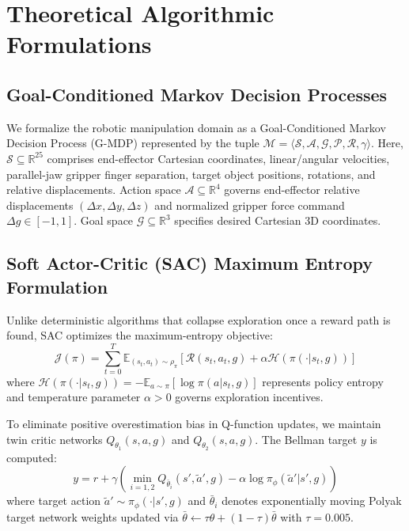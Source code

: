 \documentclass[10pt,twocolumn,a4paper]{article}
\newcommand{\R}{\mathbb{R}}
\newcommand{\E}{\mathbb{E}}
\begin{document}
\section{Theoretical Algorithmic Formulations}
\label{sec:theory}

\subsection{Goal-Conditioned Markov Decision Processes}
We formalize the robotic manipulation domain as a Goal-Conditioned Markov Decision Process (G-MDP) represented by the tuple $\mathcal{M} = \langle \mathcal{S}, \mathcal{A}, \mathcal{G}, \mathcal{P}, \mathcal{R}, \gamma \rangle$. Here, $\mathcal{S} \subseteq \R^{25}$ comprises end-effector Cartesian coordinates, linear/angular velocities, parallel-jaw gripper finger separation, target object positions, rotations, and relative displacements. Action space $\mathcal{A} \subseteq \R^4$ governs end-effector relative displacements $(\Delta x, \Delta y, \Delta z)$ and normalized gripper force command $\Delta g \in [-1, 1]$. Goal space $\mathcal{G} \subseteq \R^3$ specifies desired Cartesian 3D coordinates.

\subsection{Soft Actor-Critic (SAC) Maximum Entropy Formulation}
Unlike deterministic algorithms that collapse exploration once a reward path is found, SAC optimizes the maximum-entropy objective:
\begin{equation}
  \mathcal{J}(\pi) = \sum_{t=0}^T \E_{(s_t, a_t) \sim \rho_\pi} \left[ \mathcal{R}(s_t, a_t, g) + \alpha \mathcal{H}(\pi(\cdot|s_t, g)) \right]
  \label{eq:sac_objective}
\end{equation}
where $\mathcal{H}(\pi(\cdot|s_t, g)) = -\E_{a \sim \pi} [\log \pi(a|s_t, g)]$ represents policy entropy and temperature parameter $\alpha > 0$ governs exploration incentives.

To eliminate positive overestimation bias in Q-function updates, we maintain twin critic networks $Q_{\theta_1}(s, a, g)$ and $Q_{\theta_2}(s, a, g)$. The Bellman target $y$ is computed:
\begin{equation}
  y = r + \gamma \left( \min_{i=1,2} Q_{\bar{\theta}_i}(s', \tilde{a}', g) - \alpha \log \pi_\phi(\tilde{a}'|s', g) \right)
  \label{eq:bellman_target}
\end{equation}
where target action $\tilde{a}' \sim \pi_\phi(\cdot|s', g)$ and $\bar{\theta}_i$ denotes exponentially moving Polyak target network weights updated via $\bar{\theta} \leftarrow \tau \theta + (1-\tau)\bar{\theta}$ with $\tau = 0.005$.
\end{document}
